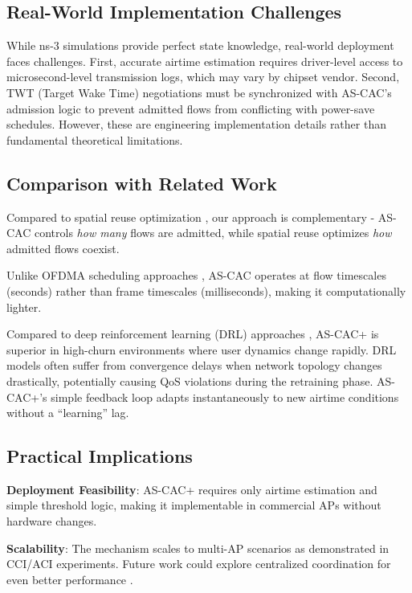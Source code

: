 \documentclass[conference]{IEEEtran}
\begin{document}
\subsection{Real-World Implementation Challenges}

While ns-3 simulations provide perfect state knowledge, real-world deployment faces challenges. First, accurate airtime estimation requires driver-level access to microsecond-level transmission logs, which may vary by chipset vendor. Second, TWT (Target Wake Time) negotiations must be synchronized with AS-CAC's admission logic to prevent admitted flows from conflicting with power-save schedules. However, these are engineering implementation details rather than fundamental theoretical limitations.

\subsection{Comparison with Related Work}

Compared to spatial reuse optimization \cite{1, 17}, our approach is complementary - AS-CAC controls \textit{how many} flows are admitted, while spatial reuse optimizes \textit{how} admitted flows coexist.

Unlike OFDMA scheduling approaches \cite{11, 15}, AS-CAC operates at flow timescales (seconds) rather than frame timescales (milliseconds), making it computationally lighter.

Compared to deep reinforcement learning (DRL) approaches \cite{18}, AS-CAC+ is superior in high-churn environments where user dynamics change rapidly. DRL models often suffer from convergence delays when network topology changes drastically, potentially causing QoS violations during the retraining phase. AS-CAC+'s simple feedback loop adapts instantaneously to new airtime conditions without a ``learning'' lag.

\subsection{Practical Implications}

\textbf{Deployment Feasibility}: AS-CAC+ requires only airtime estimation and simple threshold logic, making it implementable in commercial APs without hardware changes.

\textbf{Scalability}: The mechanism scales to multi-AP scenarios as demonstrated in CCI/ACI experiments. Future work could explore centralized coordination for even better performance \cite{18}.
\end{document}
